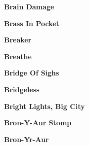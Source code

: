 \newline
\vspace{10pt} 
\begin{center}\textbf{Brain Damage}\end{center}
\newline
\vspace{10pt} 
\begin{center}\textbf{Brass In Pocket}\end{center}
\newline
\vspace{10pt} 
\begin{center}\textbf{Breaker}\end{center}
\newline
\vspace{10pt} 
\begin{center}\textbf{Breathe}\end{center}
\newline
\vspace{10pt} 
\begin{center}\textbf{Bridge Of Sighs}\end{center}
\newline
\vspace{10pt} 
\begin{center}\textbf{Bridgeless}\end{center}
\newline
\vspace{10pt} 
\begin{center}\textbf{Bright Lights, Big City}\end{center}
\newline
\vspace{10pt} 
\begin{center}\textbf{Bron-Y-Aur Stomp}\end{center}
\newline
\vspace{10pt} 
\begin{center}\textbf{Bron-Yr-Aur}\end{center}
\newline
\vspace{10pt} 
